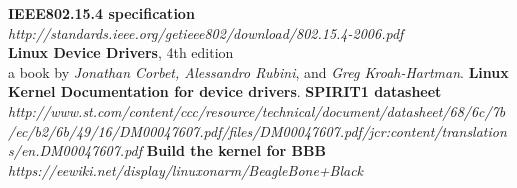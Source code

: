\begin{thebibliography}{9}
	\textbf{IEEE802.15.4 specification}\\\textit{http://standards.ieee.org/getieee802/download/802.15.4-2006.pdf}\\
	\textbf{Linux Device Drivers}, 4th edition\\
		a book by \textit{Jonathan Corbet, Alessandro Rubini}, and \textit{Greg Kroah-Hartman}.
	\textbf{Linux Kernel Documentation for device drivers}.
	\textbf{SPIRIT1 datasheet}\\
		\textit{http://www.st.com/content/ccc/resource/technical/document/datasheet/68/6c/7b/ec/b2/6b/49/16/DM00047607.pdf/files/DM00047607.pdf/jcr:content/translations/en.DM00047607.pdf}
	\textbf{Build the kernel for BBB}\\\textit{https://eewiki.net/display/linuxonarm/BeagleBone+Black}\\
\end{thebibliography}
